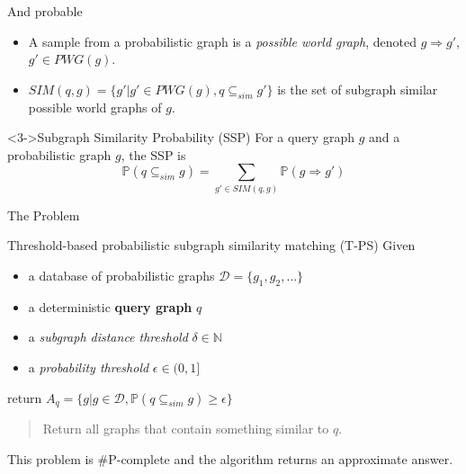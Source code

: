 \documentclass[10pt, aspectratio=149]{beamer}
\begin{document}
\begin{frame}{And probable}
  \begin{itemize}
    \item<1-> A sample from a probabilistic graph is a \textit{possible world graph}, denoted $g \Rightarrow g'$, $g' \in PWG(g)$.

    \item<2-> $SIM(q, g) = \{g' |g' \in PWG(g), q \subseteq_{sim} g' \}$ is the set of subgraph similar possible world graphs of $g$.
  \end{itemize}
    
  \begin{block}<3->{Subgraph Similarity Probability (SSP)}
  For a query graph $g$ and a probabilistic graph $g$, the SSP is
    $$
    \mathbb{P}(q \subseteq_{sim} g) = \sum_{g' \in SIM(q, g)} \mathbb{P}(g \Rightarrow g')
    $$
  \end{block}
\end{frame}


\begin{frame}{The Problem}

\begin{alertblock}{Threshold-based probabilistic subgraph similarity matching (T-PS)}
Given 
\begin{itemize}
    \item a database of probabilistic graphs $\mathcal{D} = \{g_1, g_2, \ldots\}$
    
    \item a deterministic \textbf{query graph} $q$
    
    \item a \textit{subgraph distance threshold} $\delta \in \mathbb{N}$
    
    \item a \textit{probability threshold} $\epsilon \in (0,1]$
\end{itemize}

return $A_q = \{ g | g \in \mathcal{D}, \mathbb{P}(q \subseteq_{sim} g) \geq \epsilon \}$
\end{alertblock}

\begin{quote}
    Return all graphs that contain something similar to $q$.
\end{quote}

This problem is \#P-complete \cite{sim} and the algorithm returns an approximate answer.

\end{frame}
\end{document}
